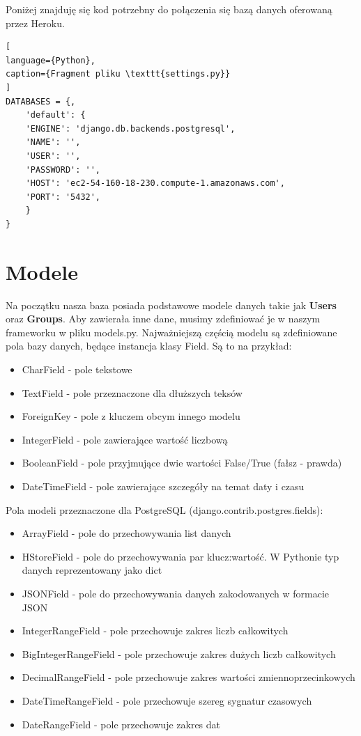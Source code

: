\documentclass[oneside,polski,logo,indent]{amuthesis}
\begin{document}
\begin{enumerate}
\begin{enumerate}
Poniżej znajduję się kod potrzebny do połączenia się bazą danych oferowaną przez Heroku. 
\begin{lstlisting}[
language={Python},
caption={Fragment pliku \texttt{settings.py}}
]
DATABASES = {,  
	'default': { 
	'ENGINE': 'django.db.backends.postgresql', 
	'NAME': '', 
	'USER': '', 
	'PASSWORD': '', 
	'HOST': 'ec2-54-160-18-230.compute-1.amazonaws.com', 
	'PORT': '5432', 
	} 
} 
\end{lstlisting}
\section{Modele}

Na początku nasza baza posiada podstawowe modele danych takie jak \textbf{Users} oraz \textbf{Groups}. Aby zawierała inne dane, musimy zdefiniować je w naszym frameworku w pliku models.py.
Najważniejszą częścią modelu są zdefiniowane pola bazy danych, będące instancja klasy Field. Są to na przykład:
\begin{itemize}
\item CharField - pole tekstowe
\item TextField - pole przeznaczone dla dłuższych teksów
\item ForeignKey - pole z kluczem obcym innego modelu
\item IntegerField - pole zawierające wartość liczbową
\item BooleanField - pole przyjmujące dwie wartości False/True (fałsz - prawda)
\item DateTimeField - pole zawierające szczegóły na temat daty i czasu
\end{itemize}
Pola modeli przeznaczone dla PostgreSQL (django.contrib.postgres.fields):
\begin{itemize}
	\item ArrayField - pole do przechowywania list danych
	\item HStoreField - pole do przechowywania par klucz:wartość. W Pythonie typ danych reprezentowany jako dict
	\item JSONField - pole do przechowywania danych zakodowanych w formacie JSON
	\item IntegerRangeField - pole przechowuje zakres liczb całkowitych
	\item BigIntegerRangeField - pole przechowuje zakres dużych liczb całkowitych
	\item DecimalRangeField - pole przechowuje zakres wartości zmiennoprzecinkowych
	\item DateTimeRangeField - pole przechowuje szereg sygnatur czasowych
	\item DateRangeField - pole przechowuje zakres dat
\end{itemize}


\end{enumerate}
\end{enumerate}
\end{document}
